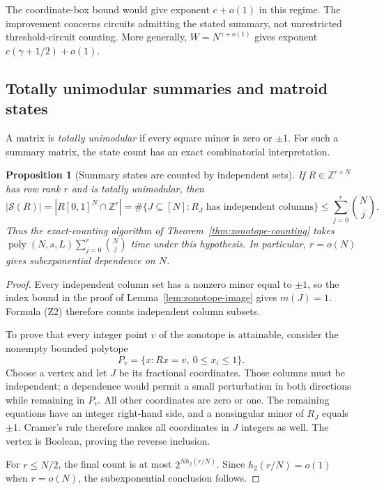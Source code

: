 \documentclass[11pt]{article}
\newtheorem{proposition}[theorem]{Proposition}
\theoremstyle{definition}
\newcommand{\Z}{\mathbb Z}
\newcommand{\poly}{\operatorname{poly}}
\begin{document}
The coordinate-box bound would give exponent \(c+o(1)\) in this regime.
The improvement concerns circuits admitting the stated summary, not
unrestricted threshold-circuit counting. More generally,
\(W=N^{\gamma+o(1)}\) gives exponent
\(c(\gamma+1/2)+o(1)\).

\subsection{Totally unimodular summaries and matroid states}
\label{sec:tu-summary}

A matrix is \emph{totally unimodular} if every square minor is zero or
\(\pm1\). For such a summary matrix, the state count has an exact
combinatorial interpretation.

\begin{proposition}[Summary states are counted by independent sets]
\label{prop:tu-summary}
If \(R\in\Z^{r\times N}\) has row rank \(r\) and is totally unimodular,
then
\[
 |\mathcal S(R)|
 = |R[0,1]^N\cap\Z^r|
 = \#\{J\subseteq[N]:R_J\text{ has independent columns}\}
 \le\sum_{j=0}^r\binom Nj.                              \tag{Z4}
\]
Thus the exact-counting algorithm of Theorem~\ref{thm:zonotope-counting}
takes \(\poly(N,s,L)\sum_{j=0}^r\binom Nj\) time under this hypothesis.
In particular, \(r=o(N)\) gives subexponential dependence on \(N\).
\end{proposition}

\begin{proof}
Every independent column set has a nonzero minor equal to \(\pm1\), so
the index bound in the proof of Lemma~\ref{lem:zonotope-image} gives
\(m(J)=1\). Formula (Z2) therefore counts independent column subsets.

To prove that every integer point \(v\) of the zonotope is attainable,
consider the nonempty bounded polytope
\[
 P_v=\{x:Rx=v,\ 0\le x_i\le1\}.
\]
Choose a vertex and let \(J\) be its fractional coordinates. Those columns
must be independent; a dependence would permit a small perturbation in
both directions while remaining in \(P_v\). All other coordinates are zero
or one. The remaining equations have an integer right-hand side, and a
nonsingular minor of \(R_J\) equals \(\pm1\). Cramer's rule therefore makes
all coordinates in \(J\) integers as well. The vertex is Boolean, proving
the reverse inclusion.

For \(r\le N/2\), the final count is at most \(2^{Nh_2(r/N)}\).
Since \(h_2(r/N)=o(1)\) when \(r=o(N)\), the subexponential conclusion follows.
\end{proof}
\end{document}
